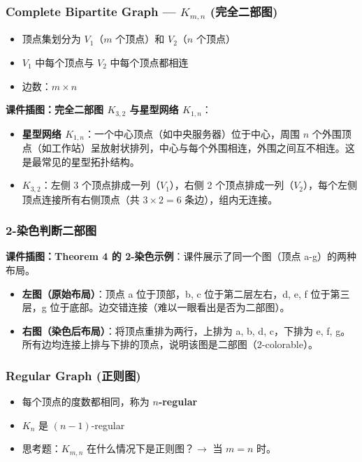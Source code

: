\documentclass[10pt,a4paper,openany]{ctexbook}
\theoremstyle{definition}
\theoremstyle{remark}
\begin{document}
\subsubsection{Complete Bipartite Graph — $K_{m,n}$ (完全二部图)}

\begin{itemize}
\item 顶点集划分为 $V_1$（$m$ 个顶点）和 $V_2$（$n$ 个顶点）
\item $V_1$ 中每个顶点与 $V_2$ 中每个顶点都相连
\item 边数：$m \times n$

\end{itemize}

\textbf{课件插图：完全二部图 $K_{3,2}$ 与星型网络 $K_{1,n}$}：
\begin{itemize}
\item \textbf{星型网络 $K_{1,n}$}：一个中心顶点（如中央服务器）位于中心，周围 $n$ 个外围顶点（如工作站）呈放射状排列，中心与每个外围相连，外围之间互不相连。这是最常见的星型拓扑结构。
\item \textbf{$K_{3,2}$}：左侧 3 个顶点排成一列（$V_1$），右侧 2 个顶点排成一列（$V_2$），每个左侧顶点连接所有右侧顶点（共 $3 \times 2 = 6$ 条边），组内无连接。

\end{itemize}

\subsubsection{2-染色判断二部图}

\textbf{课件插图：Theorem 4 的 2-染色示例}：课件展示了同一个图（顶点 a-g）的两种布局。
\begin{itemize}
\item \textbf{左图（原始布局）}：顶点 a 位于顶部，b, c 位于第二层左右，d, e, f 位于第三层，g 位于底部。边交错连接（难以一眼看出是否为二部图）。
\item \textbf{右图（染色后布局）}：将顶点重排为两行，上排为 a, b, d, c，下排为 e, f, g。所有边均连接上排与下排的顶点，说明该图是二部图（2-colorable）。

\end{itemize}

\subsubsection{Regular Graph (正则图)}

\begin{itemize}
\item 每个顶点的度数都相同，称为 \textbf{$n$-regular}
\item $K_n$ 是 $(n-1)$-regular
\item 思考题：$K_{m,n}$ 在什么情况下是正则图？$\rightarrow$ 当 $m = n$ 时。

\end{itemize}
\end{document}
